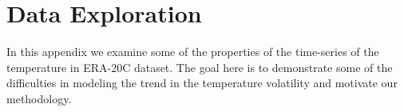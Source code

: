\documentclass[letterpaper]{article} %
\begin{document}


\section{Data Exploration}

In this appendix we examine some of the properties of the time-series
of the temperature in ERA-20C dataset. The goal here is to demonstrate
some of the difficulties in modeling the trend in the temperature
volatility and motivate our methodology. 
\end{document}
